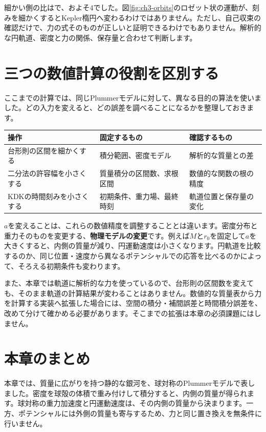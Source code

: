 細かい側の比は\chthreevalNoncRatio で、およそ4でした。図\ref{fig:ch3-orbits}のロゼット状の運動が、刻みを細かくするとKepler楕円へ変わるわけではありません。ただし、自己収束の確認だけで、力の式そのものが正しいと証明できるわけでもありません。解析的な円軌道、密度と力の関係、保存量と合わせて判断します。

\section{三つの数値計算の役割を区別する}
\label{sec:ch3-error-budget}
ここまでの計算では、同じPlummerモデルに対して、異なる目的の算法を使いました。どの入力を変えると、どの誤差を調べることになるかを整理しておきます。

\begin{center}
\begin{tabularx}{\linewidth}{lXX}\toprule
操作 & 固定するもの & 確認するもの\\\midrule
台形則の区間を細かくする & 積分範囲、密度モデル & 解析的な質量との差\\
二分法の許容幅を小さくする & 質量積分の区間数、求根区間 & 数値的な関数の根の精度\\
KDKの時間刻みを小さくする & 初期条件、重力場、最終時刻 & 軌道位置と保存量の変化\\\bottomrule
\end{tabularx}
\end{center}

$a$を変えることは、これらの数値精度を調整することとは違います。密度分布と重力そのものを変更する、\textbf{物理モデルの変更}です。例えば$M$と$r_0$を固定して$a$を大きくすると、内側の質量が減り、円運動速度は小さくなります。円軌道を比較するのか、同じ位置・速度から異なるポテンシャルでの応答を比べるのかによって、そろえる初期条件も変わります。

また、本章では軌道に解析的な力を使っているので、台形則の区間数を変えても、そのまま軌道の計算結果が変わることはありません。数値的な質量表から力を計算する実装へ拡張した場合には、空間の積分・補間誤差と時間積分誤差を、改めて分けて確かめる必要があります。そこまでの拡張は本章の必須課題にはしません。

\section{本章のまとめ}
\label{sec:ch3-summary}
本章では、質量に広がりを持つ静的な銀河を、球対称のPlummerモデルで表しました。密度を球殻の体積で重み付けして積分すると、内側の質量が得られます。球対称の重力加速度と円運動速度は、その内側の質量から決まります。一方、ポテンシャルには外側の質量も寄与するため、力と同じ置き換えを無条件に行いません。

